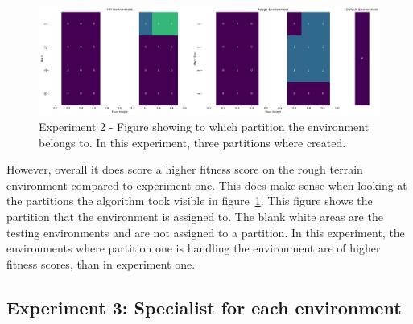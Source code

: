            \begin{figure}[ht]
                \centering
                \includegraphics[width=\linewidth]{./resources/partition_5_2906_3/generalist_heatmap_partition.png}
                \caption{Experiment 2 - Figure showing to which partition the environment belongs to. In this experiment, three partitions where created.}
                \label{fig:heat_partition_number}
            \end{figure}

            However, overall it does score a higher fitness score on the rough terrain environment compared to experiment one. This does make sense when looking at the partitions the algorithm took visible in figure~\ref{fig:heat_partition_number}. This figure shows the partition that the environment is assigned to. The blank white areas are the testing environments and are not assigned to a partition. In this experiment, the environments where partition one is handling the environment are of higher fitness scores, than in experiment one.

        \subsection{Experiment 3: Specialist for each environment}
